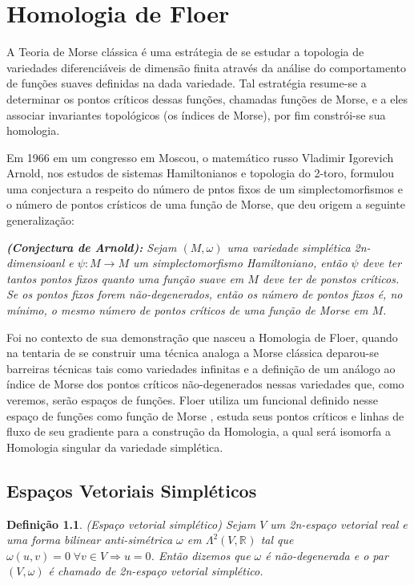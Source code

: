 \documentclass[12pt]{book}
\newtheorem{definicao}[teorema]{Definição}
\newcommand{\real}[1]{\mathbb{R}^{#1}}
\begin{document}
	\chapter{Homologia de Floer}
	A Teoria de Morse clássica é uma estrátegia de se estudar a topologia de variedades diferenciáveis de dimensão finita através da análise do comportamento de funções suaves definidas na dada variedade. Tal estratégia resume-se a determinar os pontos críticos dessas funções, chamadas funções de Morse, e a eles associar invariantes topológicos (os índices de Morse), por fim constrói-se sua homologia.
	
	Em 1966 em um congresso em Moscou, o matemático russo Vladimir Igorevich Arnold, nos estudos de sistemas Hamiltonianos e topologia do 2-toro, formulou uma conjectura a respeito do número de pntos fixos de um simplectomorfismos e o número de pontos crísticos de uma função de Morse, que deu origem a seguinte generalização:
	
	\textit{\textbf{(Conjectura de Arnold):} Sejam $(M, \omega)$ uma variedade simplética 2n-dimensioanl e $\psi : M \to M $ um simplectomorfismo Hamiltoniano, então $\psi$ deve ter tantos pontos fixos quanto uma função suave em $M$ deve ter de ponstos críticos. Se os pontos fixos forem não-degenerados, então os número de pontos fixos é, no mínimo, o mesmo número de pontos críticos de uma função de Morse em $M$.}
	
	Foi no contexto de sua demonstração que nasceu a Homologia de Floer, quando na tentaria de se construir uma técnica analoga a  Morse clássica deparou-se barreiras técnicas tais como variedades infinitas e a definição de um análogo ao índice de Morse dos pontos críticos não-degenerados nessas variedades que, como veremos, serão espaços de funções. Floer utiliza um funcional definido nesse espaço de funções como função de Morse , estuda seus pontos críticos e linhas de fluxo de seu gradiente para a construção da Homologia, a qual será isomorfa a Homologia singular da variedade simplética.
	
	\section{Espaços Vetoriais Simpléticos}
	\begin{definicao}
		(Espaço vetorial simplético) Sejam $V$ um 2n-espaço vetorial real e uma forma bilinear anti-simétrica $\omega$ em $\Lambda^{2}(V, \real{})$ tal que $\omega(u,v) = 0 \; \forall v \in V \Rightarrow u=0$. Então dizemos que $\omega$ é não-degenerada e o par $(V, \omega)$ é chamado de 2n-espaço vetorial simplético.
	\end{definicao}
	
\end{document}
